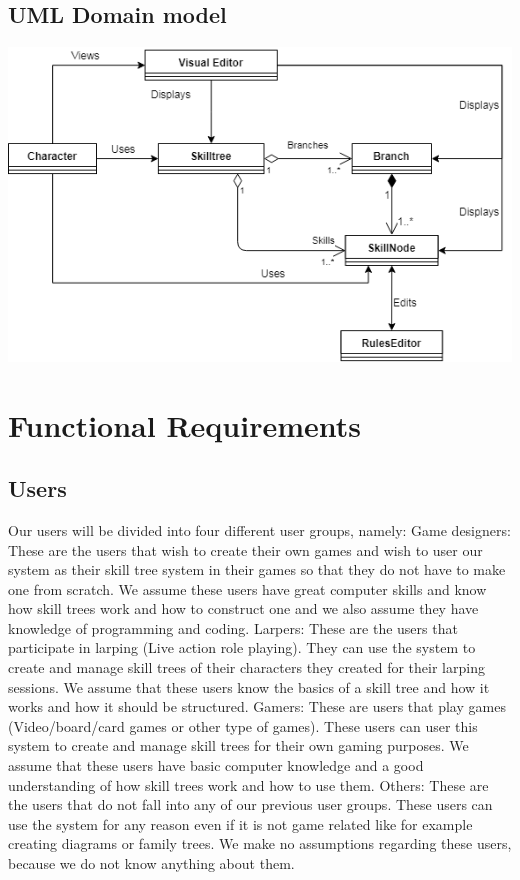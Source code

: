 \documentclass{article}
\begin{document}
  \subsection{UML Domain model}
  \includegraphics[width=\textwidth]{TriiDomainModel}
  
\section{Functional Requirements}
  \subsection{Users}
  Our users will be divided into four different user groups, namely:\newline\newline
  Game designers: These are the users that wish to create their own games and wish to user our system as their skill tree system in their games so that they do not have to make one from scratch. We assume these users have great computer skills and know how skill trees work and how to construct one and we also assume they have knowledge of programming and coding.\newline\newline
  Larpers: These are the users that participate in larping (Live action role playing). They can use the system to create and manage skill trees of their characters they created for their larping sessions. We assume that these users know the basics of a skill tree and how it works and how it should be structured.\newline\newline
  Gamers: These are users that play games (Video/board/card games or other type of games). These users can user this system to create and manage skill trees for their own gaming purposes. We assume that these users have basic computer knowledge and a good understanding of how skill trees work and how to use them.\newline\newline
  Others: These are the users that do not fall into any of our previous user groups. These users can use the system for any reason even if it is not game related like for example creating diagrams or family trees. We make no assumptions regarding these users, because we do not know anything about them.
\end{document}
